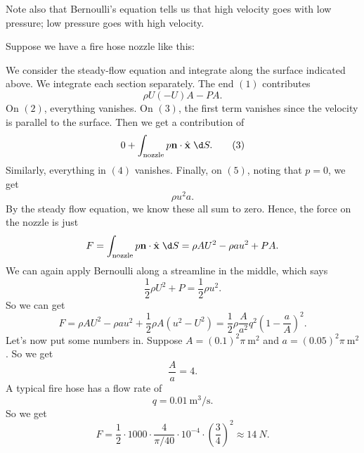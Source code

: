 \documentclass[a4paper]{article}
\begin{document}
Note also that Bernoulli's equation tells us that high velocity goes with low pressure; low pressure goes with high velocity.

\begin{eg}
  Suppose we have a fire hose nozzle like this:
  \begin{center}
  \end{center}
  We consider the steady-flow equation and integrate along the surface indicated above. We integrate each section separately. The end $(1)$ contributes
  \[
    \rho U(-U)A - PA.
  \]
  On $(2)$, everything vanishes. On $(3)$, the first term vanishes since the velocity is parallel to the surface. Then we get a contribution of
  \[
    0 + \int_{\mathrm{nozzle}} p \mathbf{n}\cdot \hat{\mathbf{x}}\;\d S.\tag{3}
  \]
  Similarly, everything in $(4)$ vanishes. Finally, on $(5)$, noting that $p = 0$, we get
  \[
    \rho u^2 a.
  \]
  By the steady flow equation, we know these all sum to zero. Hence, the force on the nozzle is just
  \[
    F = \int_{\mathrm{nozzle}} p\mathbf{n}\cdot \hat{\mathbf{x}}\;\d S = \rho AU^2 - \rho au^2 + PA.
  \]
  We can again apply Bernoulli along a streamline in the middle, which says
  \[
    \frac{1}{2}\rho U^2 + P = \frac{1}{2} \rho u^2.
  \]
  So we can get
  \[
    F = \rho AU^2 - \rho au^2 + \frac{1}{2} \rho A(u^2 - U^2) = \frac{1}{2} \rho\frac{A}{a^2}q^2 \left(1 - \frac{a}{A}\right)^2.
  \]
  Let's now put some numbers in. Suppose $A = (0.1)^2 \pi\SI{}{\meter\squared}$ and $a = (0.05)^2 \pi\SI{}{\meter\squared}$. So we get
  \[
    \frac{A}{a} = 4.
  \]
  A typical fire hose has a flow rate of
  \[
    q = \SI{0.01}{\meter\cubed\per\second}.
  \]
  So we get
  \[
    F = \frac{1}{2} \cdot 1000 \cdot \frac{4}{\pi/40} \cdot 10^{-4} \cdot \left(\frac{3}{4}\right)^2 \approx \SI{14}{N}.
  \]
\end{eg}
\end{document}
